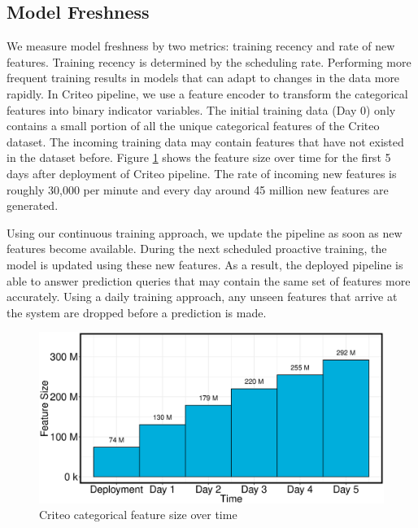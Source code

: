 \subsection{Model Freshness}
We measure model freshness by two metrics: training recency and rate of new features.
Training recency is determined by the scheduling rate.
Performing more frequent training results in models that can adapt to changes in the data more rapidly.
In Criteo pipeline, we use a feature encoder to transform the categorical features into binary indicator variables.
The initial training data (Day 0) only contains a small portion of all the unique categorical features of the Criteo dataset.
The incoming training data may contain features that have not existed in the dataset before.
Figure \ref{fig:criteo-feature-discovery} shows the feature size over time for the first 5 days after deployment of Criteo pipeline.
The rate of incoming new features is roughly 30,000 per minute and every day around 45 million new features are generated.

Using our continuous training approach, we update the pipeline as soon as new features become available.
During the next scheduled proactive training, the model is updated using these new features.
As a result, the deployed pipeline is able to answer prediction queries that may contain the same set of features more accurately.
Using a daily training approach, any unseen features that arrive at the system are dropped before a prediction is made.

\begin{figure}[H]
\includegraphics[width=\columnwidth]{../images/experiment-results/criteo-feature-discovery-experiment.eps}
\caption{Criteo categorical feature size over time}
\label{fig:criteo-feature-discovery}
\end{figure}



